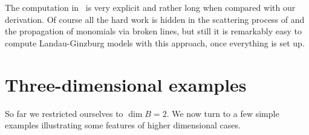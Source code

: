 \documentclass[11pt,letter]{amsart}
\theoremstyle{definition}
\theoremstyle{remark}
\numberwithin{equation}{section}
\numberwithin{figure}{section}
\begin{document}
The computation in~\cite[Prop.\,3.2]{auroux2} is very explicit and rather long
when compared with our derivation. Of course all the hard work is hidden in the
scattering process of \cite{affinecomplex} and the propagation of monomials via
broken lines, but still it is remarkably easy to compute Landau-Ginzburg models
with this approach, once everything is set up.



\section{Three-dimensional examples}

So far we restricted ourselves to $\dim B =2$. We now turn to a few simple
examples illustrating some features of higher dimensional cases.
\end{document}
